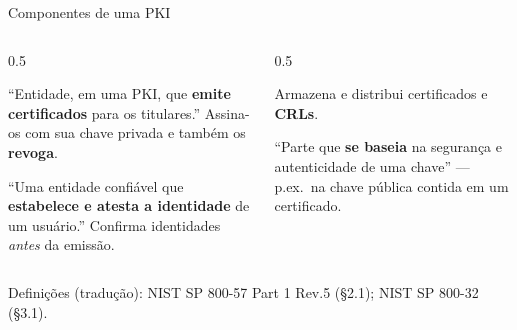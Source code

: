 \documentclass{beamer}
\begin{document}
\begin{frame}{Componentes de uma PKI}
    \begin{columns}[T]
        \begin{column}{0.5\textwidth}
            \begin{tcolorbox}[colback=blue!6,colframe=blue!50!black,boxrule=0.5pt,title=\footnotesize Autoridade Certificadora (CA)]
                \footnotesize ``Entidade, em uma PKI, que \textbf{emite certificados} para os titulares.'' Assina-os com sua chave privada e também os \textbf{revoga}.
            \end{tcolorbox}
            \vspace{0.4em}
            \begin{tcolorbox}[colback=green!6,colframe=green!50!black,boxrule=0.5pt,title=\footnotesize Autoridade de Registro (RA)]
                \footnotesize ``Uma entidade confiável que \textbf{estabelece e atesta a identidade} de um usuário.'' Confirma identidades \emph{antes} da emissão.
            \end{tcolorbox}
        \end{column}
        \begin{column}{0.5\textwidth}
            \begin{tcolorbox}[colback=gray!8,colframe=gray!60!black,boxrule=0.5pt,title=\footnotesize Repositório]
                \footnotesize Armazena e distribui certificados e \textbf{CRLs}.
            \end{tcolorbox}
            \vspace{0.4em}
            \begin{tcolorbox}[colback=orange!8,colframe=orange!70!black,boxrule=0.5pt,title=\footnotesize Parte confiante (\textit{relying party})]
                \footnotesize ``Parte que \textbf{se baseia} na segurança e autenticidade de uma chave'' --- p.ex.\ na chave pública contida em um certificado.
            \end{tcolorbox}
        \end{column}
    \end{columns}
    \smallskip
    {\tiny Definições (tradução): NIST SP 800-57 Part 1 Rev.5 (§2.1); NIST SP 800-32 (§3.1).}
\end{frame}
\end{document}

